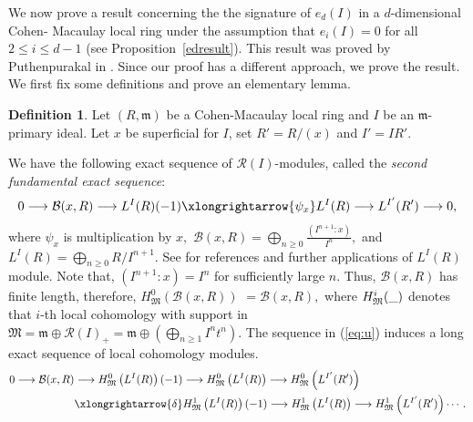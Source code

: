 \documentclass[reqno,a4paper,dvipsnames]{amsart}
\newcommand{\m}{\mathfrak{m} }
\newcommand{\M}{\mathfrak{M}}
\theoremstyle{definition}
\newtheorem{definition}[theorem]{Definition}
\begin{document}
We now prove a result concerning the
the signature of $e_{d}(I)$ in  a $d$-dimensional Cohen-
 Macaulay local ring under the assumption that $e_{i}(I)=0$ for all $2 \leq i \leq d-1$  (see Proposition~\ref{edresult}).  This result was 
  proved by Puthenpurakal  in \cite[Theorem 1.4]{tjp3}. Since   our proof has a different approach, we prove the result.  
 We first fix some definitions and prove an elementary lemma.

 \begin{definition} \cite[6.2, 6.3]{tjp}
Let $(R,\m)$ be a Cohen-Macaulay local ring and $I$ be an $\m$-primary ideal. Let $x$ be superficial for $I$,  set $R'=R/(x)$ and $I'=IR'.$ 

We have the following exact sequence of $\mathcal{R}(I)$-modules, called the \textit{second fundamental exact sequence}:
\begin{equation}
\label{eq:u}
    0\longrightarrow \mathcal{B}(x,R) \longrightarrow L^{I}(R)(-1
) \xlongrightarrow{\psi_{x}} L^{I}(R) \longrightarrow L^{I'}(R') \longrightarrow 0,
\end{equation}
 where $\psi_{x}$ is multiplication by $x,$ $\mathcal{B}(x,R)= \displaystyle \bigoplus_{n \geq 0} \frac{(I^{n+1}:x)}{I^{n}},$ and $L^{I}(R)=\displaystyle \bigoplus_{n \geq 0} R/I^{n+1}.$  See \cite{tjp,tjp2} for references and further applications of $L^{I}(R)$ module.  
 Note that, $(I^{n+1}:x)=I^{n}$ for sufficiently large $n.$ Thus, $\mathcal{B}(x,R)$ has finite length, therefore, $H^{0}_{\M}\left(\mathcal{B}(x,R)\right)$ $=\mathcal{B}(x,R),$ where $H^{i}_{\mathfrak{M}}(\text{\textunderscore})$ denotes that $i$-th local cohomology with support in $\M=\m \oplus \mathcal{R}(I)_{+}=\m \oplus\displaystyle \left(\bigoplus_{n \geq 1}I^{n}t^{n}\right).$
 The sequence in (\ref{eq:u}) induces a long exact sequence of local cohomology modules. 
\begin{equation} \label{4}
    \begin{aligned}
        0 \longrightarrow \mathcal{B}(x,R)  &  \longrightarrow H^{0}_{\M}\left(L^{I}(R)\right)(-1) \longrightarrow H^{0}_{\M}\left(L^{I}(R)\right) \longrightarrow H^{0}_{\M}\left(L^{I'}(R')\right) \\
     & \xlongrightarrow{\delta} H^{1}_{\M}\left(L^{I}(R)\right)(-1) \longrightarrow H^{1}_{\M}\left(L^{I}(R)\right) \longrightarrow H^{1}_{\M}\left(L^{I'}(R')\right) \cdots.
    \end{aligned}
\end{equation}
\end{definition}
\end{document}
